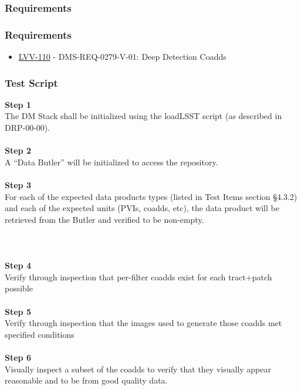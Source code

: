 \hypertarget{requirements-8}{%
\subsubsection{Requirements}\label{requirements-8}}

\hypertarget{requirements-9}{%
\subsubsection{Requirements}\label{requirements-9}}

\begin{itemize}
\tightlist
\item
  \href{https://jira.lsstcorp.org/browse/LVV-110}{LVV-110} -
  DMS-REQ-0279-V-01: Deep Detection Coadds
\end{itemize}

\hypertarget{test-script-4}{%
\subsubsection{Test Script}\label{test-script-4}}

\textbf{Step 1}\\
The DM Stack shall be initialized using the loadLSST script (as
described in DRP-00-00).\\
~\\
\textbf{Step 2}\\
A ``Data Butler'' will be initialized to access the repository.\\
~\\
\textbf{Step 3}\\
For each of the expected data products types (listed in Test Items
section §4.3.2) and each of the expected units (PVIs, coadds, etc), the
data product will be retrieved from the Butler and verified to be
non-empty.\\
~\\
~\\
~\\
\textbf{Step 4}\\
Verify through inspection that per-filter coadds exist for each
tract+patch possible\\
~\\
\textbf{Step 5}\\
Verify through inspection that the images used to generate those coadds
met specified conditions\\
~\\
\textbf{Step 6}\\
Visually inspect a subset of the coadds to verify that they visually
appear reasonable and to be from good quality data.\\
~\\

